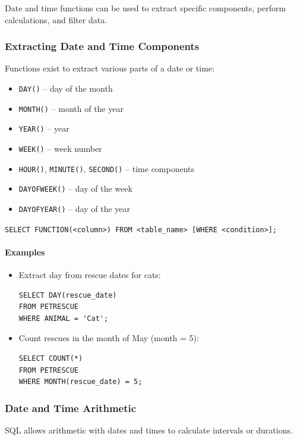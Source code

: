\documentclass{article}
\begin{document}
Date and time functions can be used to extract specific components, perform calculations, and filter data.

\subsubsection{Extracting Date and Time Components}
Functions exist to extract various parts of a date or time:
\begin{itemize}
    \item \texttt{DAY()} – day of the month
    \item \texttt{MONTH()} – month of the year
    \item \texttt{YEAR()} – year
    \item \texttt{WEEK()} – week number
    \item \texttt{HOUR()}, \texttt{MINUTE()}, \texttt{SECOND()} – time components
    \item \texttt{DAYOFWEEK()} – day of the week
    \item \texttt{DAYOFYEAR()} – day of the year
\end{itemize}

\begin{FormulaBox}
\texttt{SELECT FUNCTION(<column>) FROM <table\_name> [WHERE <condition>];}
\end{FormulaBox}

\paragraph{Examples}
\begin{itemize}
    \item Extract day from rescue dates for cats:
\begin{verbatim}
SELECT DAY(rescue_date)
FROM PETRESCUE
WHERE ANIMAL = 'Cat';
\end{verbatim}

    \item Count rescues in the month of May (month = 5):
\begin{verbatim}
SELECT COUNT(*)
FROM PETRESCUE
WHERE MONTH(rescue_date) = 5;
\end{verbatim}
\end{itemize}

\subsubsection{Date and Time Arithmetic}
SQL allows arithmetic with dates and times to calculate intervals or durations.
\end{document}

